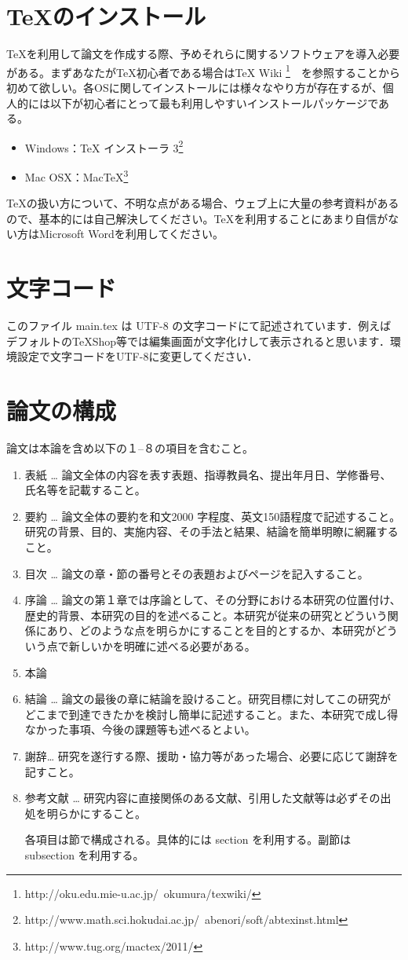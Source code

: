 \documentclass[a4paper]{jsarticle}
\begin{document}
\section{\TeX のインストール}
\TeX を利用して論文を作成する際、予めそれらに関するソフトウェアを導入必要がある。まずあなたが\TeX 初心者である場合はTeX Wiki \footnote{http://oku.edu.mie-u.ac.jp/~okumura/texwiki/}　を参照することから初めて欲しい。各OSに関してインストールには様々なやり方が存在するが、個人的には以下が初心者にとって最も利用しやすいインストールパッケージである。
\begin{itemize}
\item Windows：TeX インストーラ 3\footnote{http://www.math.sci.hokudai.ac.jp/~abenori/soft/abtexinst.html}
\item Mac OSX：MacTeX\footnote{http://www.tug.org/mactex/2011/}
\end{itemize}

\TeX の扱い方について、不明な点がある場合、ウェブ上に大量の参考資料があるので、基本的には自己解決してください。\TeX を利用することにあまり自信がない方はMicrosoft Wordを利用してください。


\section{文字コード}
このファイル main.tex は UTF-8 の文字コードにて記述されています．例えばデフォルトのTeXShop等では編集画面が文字化けして表示されると思います．環境設定で文字コードをUTF-8に変更してください．

\section{論文の構成}
論文は本論を含め以下の１--８の項目を含むこと。
\begin{enumerate}
\item 表紙 … 論文全体の内容を表す表題、指導教員名、提出年月日、学修番号、氏名等を記載すること。
\item 要約 … 論文全体の要約を和文2000 字程度、英文150語程度で記述すること。研究の背景、目的、実施内容、その手法と結果、結論を簡単明瞭に網羅すること。
\item 目次 … 論文の章・節の番号とその表題およびページを記入すること。
\item 序論 … 論文の第１章では序論として、その分野における本研究の位置付け、歴史的背景、本研究の目的を述べること。本研究が従来の研究とどういう関係にあり、どのような点を明らかにすることを目的とするか、本研究がどういう点で新しいかを明確に述べる必要がある。
\item 本論
\item 結論 … 論文の最後の章に結論を設けること。研究目標に対してこの研究がどこまで到達できたかを検討し簡単に記述すること。また、本研究で成し得なかった事項、今後の課題等も述べるとよい。
\item 謝辞… 研究を遂行する際、援助・協力等があった場合、必要に応じて謝辞を記すこと。
\item 参考文献 … 研究内容に直接関係のある文献、引用した文献等は必ずその出処を明らかにすること。

各項目は節で構成される。具体的には section を利用する。副節は subsection を利用する。
\end{enumerate}
\end{document}
